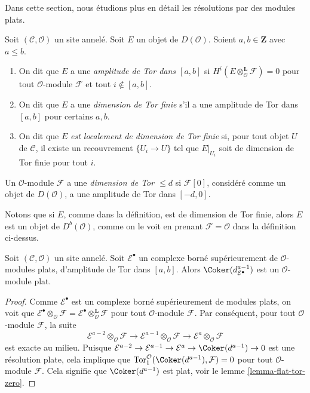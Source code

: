 \noindent
Dans cette section, nous étudions plus en détail les résolutions par des
modules plats.

\begin{definition}
\label{definition-tor-amplitude}
Soit $(\mathcal{C}, \mathcal{O})$ un site annelé.
Soit $E$ un objet de $D(\mathcal{O})$.
Soient $a, b \in \mathbf{Z}$ avec $a \leq b$.
\begin{enumerate}
\item On dit que $E$ a une {\it amplitude de Tor dans $[a, b]$} si
$H^i(E \otimes_\mathcal{O}^\mathbf{L} \mathcal{F}) = 0$ pour tout
$\mathcal{O}$-module $\mathcal{F}$ et tout $i \not \in [a, b]$.
\item On dit que $E$ a une {\it dimension de Tor finie} s'il a une amplitude
de Tor dans $[a, b]$ pour certains $a, b$.
\item On dit que $E$ {\it est localement de dimension de Tor finie} si, pour
tout objet $U$ de $\mathcal{C}$, il existe un recouvrement $\{U_i \to U\}$
tel que $E|_{U_i}$ soit de dimension de Tor finie pour tout $i$.
\end{enumerate}
Un $\mathcal{O}$-module $\mathcal{F}$ a une {\it dimension de Tor $\leq d$}
si $\mathcal{F}[0]$, considéré comme un objet de $D(\mathcal{O})$, a une
amplitude de Tor dans $[-d, 0]$.
\end{definition}

\noindent
Notons que si $E$, comme dans la définition, est de dimension de Tor finie,
alors $E$ est un objet de $D^b(\mathcal{O})$, comme on le voit en prenant
$\mathcal{F} = \mathcal{O}$ dans la définition ci-dessus.

\begin{lemma}
\label{lemma-last-one-flat}
Soit $(\mathcal{C}, \mathcal{O})$ un site annelé. Soit
$\mathcal{E}^\bullet$ un complexe borné supérieurement de
$\mathcal{O}$-modules plats, d'amplitude de Tor dans $[a, b]$. Alors
$\Coker(d_{\mathcal{E}^\bullet}^{a - 1})$ est un $\mathcal{O}$-module plat.
\end{lemma}

\begin{proof}
Comme $\mathcal{E}^\bullet$ est un complexe borné supérieurement de modules
plats, on voit que
$\mathcal{E}^\bullet \otimes_\mathcal{O} \mathcal{F} =
\mathcal{E}^\bullet \otimes_\mathcal{O}^{\mathbf{L}} \mathcal{F}$
pour tout $\mathcal{O}$-module $\mathcal{F}$. Par conséquent, pour tout
$\mathcal{O}$-module $\mathcal{F}$, la suite
$$
\mathcal{E}^{a - 2} \otimes_\mathcal{O} \mathcal{F} \to
\mathcal{E}^{a - 1} \otimes_\mathcal{O} \mathcal{F} \to
\mathcal{E}^a \otimes_\mathcal{O} \mathcal{F}
$$
est exacte au milieu. Puisque
$\mathcal{E}^{a - 2} \to \mathcal{E}^{a - 1} \to \mathcal{E}^a \to
\Coker(d^{a - 1}) \to 0$
est une résolution plate, cela implique que
$\text{Tor}_1^\mathcal{O}(\Coker(d^{a - 1}), \mathcal{F}) = 0$
pour tout $\mathcal{O}$-module $\mathcal{F}$. Cela signifie que
$\Coker(d^{a - 1})$ est plat, voir le lemme \ref{lemma-flat-tor-zero}.
\end{proof}

